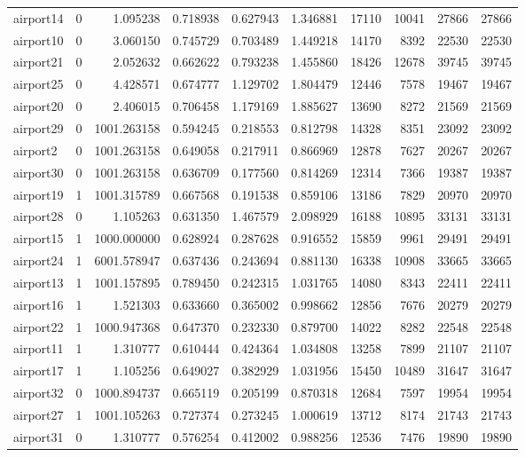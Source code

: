 \begin{longtable}{|l|r|r|r|r|r|r|r|r|r|}
airport14 & 0 & 1.095238 & 0.718938 & 0.627943 & 1.346881 & 17110 & 10041 & 27866 & 27866 \\
airport10 & 0 & 3.060150 & 0.745729 & 0.703489 & 1.449218 & 14170 & 8392 & 22530 & 22530 \\
airport21 & 0 & 2.052632 & 0.662622 & 0.793238 & 1.455860 & 18426 & 12678 & 39745 & 39745 \\
airport25 & 0 & 4.428571 & 0.674777 & 1.129702 & 1.804479 & 12446 & 7578 & 19467 & 19467 \\
airport20 & 0 & 2.406015 & 0.706458 & 1.179169 & 1.885627 & 13690 & 8272 & 21569 & 21569 \\
airport29 & 0 & 1001.263158 & 0.594245 & 0.218553 & 0.812798 & 14328 & 8351 & 23092 & 23092 \\
airport2 & 0 & 1001.263158 & 0.649058 & 0.217911 & 0.866969 & 12878 & 7627 & 20267 & 20267 \\
airport30 & 0 & 1001.263158 & 0.636709 & 0.177560 & 0.814269 & 12314 & 7366 & 19387 & 19387 \\
airport19 & 1 & 1001.315789 & 0.667568 & 0.191538 & 0.859106 & 13186 & 7829 & 20970 & 20970 \\
airport28 & 0 & 1.105263 & 0.631350 & 1.467579 & 2.098929 & 16188 & 10895 & 33131 & 33131 \\
airport15 & 1 & 1000.000000 & 0.628924 & 0.287628 & 0.916552 & 15859 & 9961 & 29491 & 29491 \\
airport24 & 1 & 6001.578947 & 0.637436 & 0.243694 & 0.881130 & 16338 & 10908 & 33665 & 33665 \\
airport13 & 1 & 1001.157895 & 0.789450 & 0.242315 & 1.031765 & 14080 & 8343 & 22411 & 22411 \\
airport16 & 1 & 1.521303 & 0.633660 & 0.365002 & 0.998662 & 12856 & 7676 & 20279 & 20279 \\
airport22 & 1 & 1000.947368 & 0.647370 & 0.232330 & 0.879700 & 14022 & 8282 & 22548 & 22548 \\
airport11 & 1 & 1.310777 & 0.610444 & 0.424364 & 1.034808 & 13258 & 7899 & 21107 & 21107 \\
airport17 & 1 & 1.105256 & 0.649027 & 0.382929 & 1.031956 & 15450 & 10489 & 31647 & 31647 \\
airport32 & 0 & 1000.894737 & 0.665119 & 0.205199 & 0.870318 & 12684 & 7597 & 19954 & 19954 \\
airport27 & 1 & 1001.105263 & 0.727374 & 0.273245 & 1.000619 & 13712 & 8174 & 21743 & 21743 \\
airport31 & 0 & 1.310777 & 0.576254 & 0.412002 & 0.988256 & 12536 & 7476 & 19890 & 19890 \\

\end{longtable}
